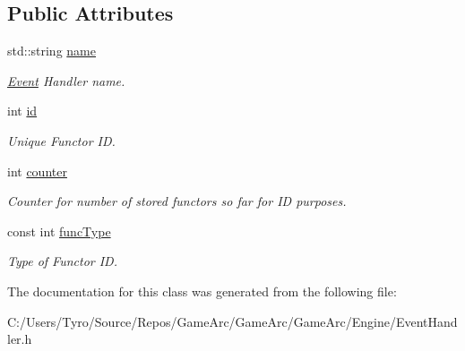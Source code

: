 \subsection*{Public Attributes}
\begin{DoxyCompactItemize}
\item 
\mbox{\label{class_event_handler_aa5fd950e79ff5faedf4f728c321f6a8f}} 
std\+::string \mbox{\hyperlink{class_event_handler_aa5fd950e79ff5faedf4f728c321f6a8f}{name}}
\begin{DoxyCompactList}\small\item\em \mbox{\hyperlink{class_event}{Event}} Handler name. \end{DoxyCompactList}\item 
\mbox{\label{class_event_handler_a42e721397724e29344fb56eeed8923b5}} 
int \mbox{\hyperlink{class_event_handler_a42e721397724e29344fb56eeed8923b5}{id}}
\begin{DoxyCompactList}\small\item\em Unique Functor ID. \end{DoxyCompactList}\item 
\mbox{\label{class_event_handler_a718ef39196fb47f8f0d66538b9fa31d7}} 
int \mbox{\hyperlink{class_event_handler_a718ef39196fb47f8f0d66538b9fa31d7}{counter}}
\begin{DoxyCompactList}\small\item\em Counter for number of stored functors so far for ID purposes. \end{DoxyCompactList}\item 
\mbox{\label{class_event_handler_af42c2a85560ab2f1f9c83f25c2c15fca}} 
const int \mbox{\hyperlink{class_event_handler_af42c2a85560ab2f1f9c83f25c2c15fca}{func\+Type}}
\begin{DoxyCompactList}\small\item\em Type of Functor ID. \end{DoxyCompactList}\end{DoxyCompactItemize}


The documentation for this class was generated from the following file\+:\begin{DoxyCompactItemize}
\item 
C\+:/\+Users/\+Tyro/\+Source/\+Repos/\+Game\+Arc/\+Game\+Arc/\+Game\+Arc/\+Engine/Event\+Handler.\+h\end{DoxyCompactItemize}
